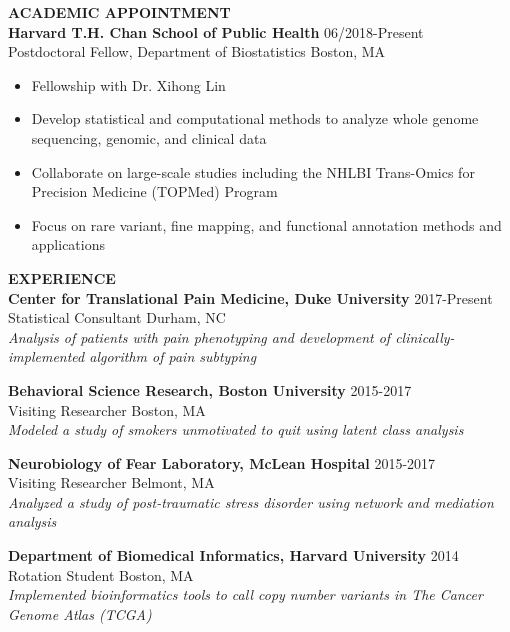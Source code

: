 \documentclass[10pt]{article}
\begin{document}
\vspace{0.3cm}


{\bf ACADEMIC APPOINTMENT} \hrulefill \\

\textbf{Harvard T.H. Chan School of Public Health} \hfill 06/2018-Present\\
\indent Postdoctoral Fellow, Department of Biostatistics \hfill Boston, MA
\begin{itemize}
	\item Fellowship with Dr. Xihong Lin
	\item Develop statistical and computational methods to analyze whole genome sequencing, genomic, and clinical data
	\item Collaborate on large-scale studies including the NHLBI Trans-Omics for Precision Medicine (TOPMed) Program
	\item Focus on rare variant, fine mapping, and functional annotation methods and applications \\
\end{itemize}

\vspace{0.3cm}

{ \bf EXPERIENCE} \hrulefill \\

\textbf{Center for Translational Pain Medicine, Duke University} \hfill 2017-Present\\
\indent Statistical Consultant  \hfill Durham, NC\\
\indent \textit{Analysis of patients with pain phenotyping and development of clinically-implemented algorithm of pain subtyping \\}

\textbf{Behavioral Science Research, Boston University} \hfill 2015-2017\\
\indent Visiting Researcher \hfill Boston, MA\\
\indent \textit{Modeled a study of smokers unmotivated to quit using latent class analysis  \\}

\textbf{Neurobiology of Fear Laboratory, McLean Hospital} \hfill 2015-2017\\
\indent Visiting Researcher \hfill Belmont, MA\\
\indent \textit{Analyzed a study of post-traumatic stress disorder using network and mediation analysis \\}

\textbf{Department of Biomedical Informatics, Harvard University} \hfill 2014\\
\indent Rotation Student \hfill Boston, MA\\
\indent \textit{Implemented bioinformatics tools to call copy number variants in The Cancer Genome Atlas (TCGA)  \\}
\end{document}
